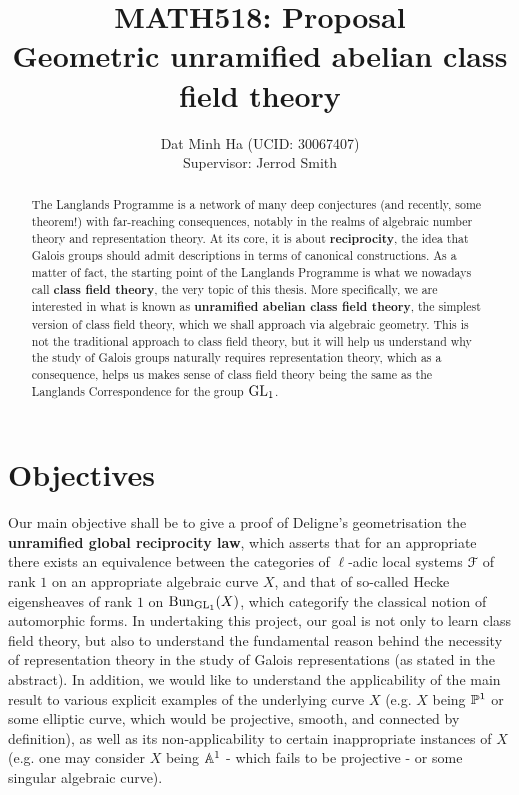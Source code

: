 
\usepackage{soul}





	\title{\textbf{MATH518: Proposal
	\\
	Geometric unramified abelian class field theory}}
	
	\author{Dat Minh Ha (UCID: 30067407)\\Supervisor: Jerrod Smith}
	\maketitle
	
	\begin{abstract}
	    The Langlands Programme is a network of many deep conjectures (and recently, some theorem!) with far-reaching consequences, notably in the realms of algebraic number theory and representation theory. At its core, it is about \textbf{reciprocity}, the idea that Galois groups should admit descriptions in terms of canonical constructions. As a matter of fact, the starting point of the Langlands Programme is what we nowadays call \textbf{class field theory}, the very topic of this thesis. More specifically, we are interested in what is known as \textbf{unramified abelian class field theory}, the simplest version of class field theory, which we shall approach via algebraic geometry. This is not the traditional approach to class field theory, but it will help us understand why the study of Galois groups naturally requires representation theory, which as a consequence, helps us makes sense of class field theory being the same as the Langlands Correspondence for the group $\GL_1$.
	\end{abstract}
	    
	\section{Objectives}
	    Our main objective shall be to give a proof of Deligne's geometrisation the \textbf{unramified global reciprocity law}, which asserts that for an appropriate there exists an equivalence between the categories of $\ell$-adic local systems $\calF$ of rank $1$ on an appropriate algebraic curve $X$, and that of so-called Hecke eigensheaves of rank $1$ on $\Bun_{\GL_1}(X)$, which categorify the classical notion of automorphic forms. In undertaking this project, our goal is not only to learn class field theory, but also to understand the fundamental reason behind the necessity of representation theory in the study of Galois representations (as stated in the abstract). In addition, we would like to understand the applicability of the main result to various explicit examples of the underlying curve $X$ (e.g. $X$ being $\P^1$ or some elliptic curve, which would be projective, smooth, and connected by definition), as well as its non-applicability to certain inappropriate instances of $X$ (e.g. one may consider $X$ being $\A^1$ - which fails to be projective - or some singular algebraic curve).
	
